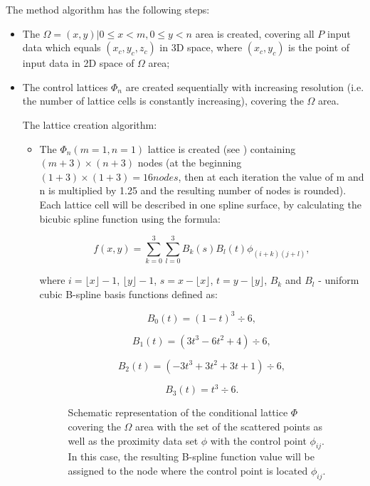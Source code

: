 The method algorithm has the following steps:
\begin{itemize}
	\item 
	The $ \Omega = {(x,y) | 0 \le x < m, 0 \le y < n} $ area is created, covering all $ P $ input data which equals $ {(x_{c},y_{c},z_{c})} $ in 3D space, where $ (x_{c},y_{c}) $ is the point of input data in 2D space of $ \Omega $ area; 
	\item 
	The control lattices $ \Phi_{n} $ are created sequentially with increasing resolution (i.e. the number of lattice cells is constantly increasing), covering the $ \Omega $ area. 
	
	The lattice creation algorithm:
	\begin{itemize}
		\item 
		The $ \Phi_{n} (m=1, n=1) $ lattice is created (see ) containing $ (m+3)\times(n+3) $ nodes (at the beginning $ (1+3)\times(1+3) = 16 nodes $, then at each iteration the value of m and n is multiplied by 1.25 and the resulting number of nodes is rounded). Each lattice cell will be described in one spline surface, by calculating the bicubic spline function using the formula:
		
		$$
		f(x,y) = \sum_{k=0}^3 \sum_{l=0}^3 B_{k}(s)B_{l}(t)\phi_{(i+k)(j+l)},
		$$
		
		where $ i = \lfloor x \rfloor -1 $, $ \lfloor y \rfloor -1 $, $ s= x - \lfloor x \rfloor $, $ t = y - \lfloor y \rfloor $, $ B_{k} $ and $ B_{l} $ - uniform cubic B-spline basis functions defined as:
		
		$$
		B_{0}(t) = (1-t)^3 \div 6,
		$$
		
		$$
		B_{1}(t) = (3t^3 - 6t^2 + 4) \div 6,
		$$
		
		$$
		B_{2}(t) = (-3t^3 +3t^2 +3t + 1) \div 6,
		$$
		
		$$
		B_{3}(t) = t^3 \div 6.
		$$
		
		\begin{figure}[h]
			\caption{Schematic representation of the conditional lattice $ \Phi $ covering the $ \Omega $ area with the set of the scattered points as well as the proximity data set $ \phi $ with the control point $ \phi_{ij} $. In this case, the resulting B-spline function value will be assigned to the node where the control point is located $ \phi_{ij} $.}
			\label{ris:phi_lattice}
		\end{figure} 
		
		\clearpage
		

\end{itemize}
\end{itemize}
